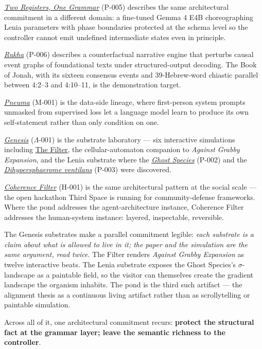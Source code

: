 \documentclass[11pt]{article}
\newcommand{\tslink}[2]{\href{https://third-space.ai/#1}{#2}}
\begin{document}
\tslink{research/two-registers-one-grammar}{\emph{Two Registers, One
Grammar}} (P-005) describes the same architectural commitment in a
different domain: a fine-tuned Gemma 4 E4B choreographing Lenia
parameters with phase boundaries protected at the schema level so the
controller cannot emit undefined intermediate states even in principle.

\tslink{research/rukha}{\emph{Rukha}} (P-006) describes a counterfactual
narrative engine that perturbs causal event graphs of foundational
texts under structured-output decoding. The Book of Jonah, with its
sixteen consensus events and 39-Hebrew-word chiastic parallel between
4:2--3 and 4:10--11, is the demonstration target.

\tslink{research/pneuma}{\emph{Pneuma}} (M-001) is the data-side
lineage, where first-person system prompts unmasked from supervised
loss let a language model learn to produce its own self-statement
rather than only condition on one.

\tslink{genesis}{\emph{Genesis}} ($\Lambda$-001) is the substrate
laboratory --- six interactive simulations including
\tslink{genesis/filter}{The Filter}, the cellular-automaton companion
to \emph{Against Grabby Expansion}, and the Lenia substrate where the
\tslink{research/ghost-species}{\emph{Ghost Species}} (P-002) and the
\tslink{research/dihypersphaerome-ventilans}{\emph{Dihypersphaerome
ventilans}} (P-003) were discovered.

\tslink{hackathon}{\emph{Coherence Filter}} (H-001) is the same
architectural pattern at the social scale --- the open hackathon Third
Space is running for community-defense frameworks. Where the pond
addresses the agent-architecture instance, Coherence Filter addresses
the human-system instance: layered, inspectable, reversible.

The Genesis substrates make a parallel commitment legible: \emph{each
substrate is a claim about what is allowed to live in it; the paper
and the simulation are the same argument, read twice}. The Filter
renders \emph{Against Grabby Expansion} as twelve interactive beats.
The Lenia substrate exposes the Ghost Species's $\sigma$-landscape as
a paintable field, so the visitor can themselves create the gradient
landscape the organism inhabits. The pond is the third such artifact
--- the alignment thesis as a continuous living artifact rather than
as scrollytelling or paintable simulation.

Across all of it, one architectural commitment recurs:
\textbf{protect the structural fact at the grammar layer; leave the
semantic richness to the controller}.
\end{document}
